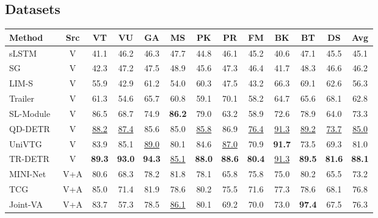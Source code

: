 \subsection{Datasets}

\begin{table*}[!ht]
    \centering
    \begin{tabular}{lcccccccccccc}
        \toprule
        \textbf{Method} & \textbf{Src} & VT & VU & GA & MS & PK & PR & FM & BK & BT & DS & Avg \\
        \midrule
        sLSTM~\cite{DBLP:conf/eccv/ZhangCSG16} & V & 41.1 & 46.2 & 46.3 & 47.7 & 44.8 & 46.1 & 45.2 & 40.6 & 47.1 & 45.5 & 45.1 \\
        SG~\cite{DBLP:journals/tmm/YuanTLF20} & V & 42.3 & 47.2 & 47.5 & 48.9 & 45.6 & 47.3 & 46.4 & 41.7 & 48.3 & 46.6 & 46.2 \\
        LIM-S~\cite{xiong2019less} & V & 55.9 & 42.9 & 61.2 & 54.0 & 60.3 & 47.5 & 43.2 & 66.3 & 69.1 & 62.6 & 56.3 \\
        Trailer~\cite{DBLP:conf/eccv/WangLPM20} & V & 61.3 & 54.6 & 65.7 & 60.8 & 59.1 & 70.1 & 58.2 & 64.7 & 65.6 & 68.1 & 62.8 \\
        SL-Module~\cite{DBLP:conf/iccv/XuWNZSW21} & V & 86.5 & 68.7 & 74.9 & \textbf{86.2} & 79.0 & 63.2 & 58.9 & 72.6 & 78.9 & 64.0 & 73.3 \\
        QD-DETR~\cite{moon2023query} & V & \underline{88.2} & \underline{87.4} & 85.6 & 85.0 & \underline{85.8} & 86.9 & \underline{76.4} & \underline{91.3} & \underline{89.2} & \underline{73.7} & \underline{85.0} \\
        UniVTG~\cite{DBLP:journals/corr/abs-2307-16715} & V & 83.9 & 85.1 & \underline{89.0} & 80.1 & 84.6 & \underline{87.0} & 70.9 & \textbf{91.7} & 73.5 & 69.3 & 81.0 \\
        \rowcolor[rgb]{0.78,0.78,0.78} TR-DETR & V & \textbf{89.3} & \textbf{93.0} & \textbf{94.3} & \underline{85.1} & \textbf{88.0} & \textbf{88.6} & \textbf{80.4} & \underline{91.3} & \textbf{89.5} & \textbf{81.6} & \textbf{88.1} \\
        \midrule
        MINI-Net~\cite{DBLP:conf/eccv/HongHLZ20} & V+A & 80.6 & 68.3 & 78.2 & 81.8 & 78.1 & 65.8 & 75.8 & 75.0 & 80.2 & 65.5 & 73.2 \\
        TCG~\cite{DBLP:conf/iccv/YeSGWBL021} & V+A & 85.0 & 71.4 & 81.9 & 78.6 & 80.2 & 75.5 & 71.6 & 77.3 & 78.6 & 68.1 & 76.8 \\
        Joint-VA~\cite{DBLP:conf/iccv/BadamdorjRWC21} & V+A & 83.7 & 57.3 & 78.5 & \underline{86.1} & 80.1 & 69.2 & 70.0 & 73.0 & \textbf{97.4} & 67.5 & 76.3 \\

\end{tabular}
\end{table*}
